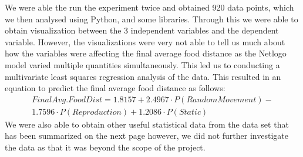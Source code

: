 \documentclass[a4paper, 11pt]{article}
\begin{document}
We were able the run the experiment twice and obtained 920 data points, which we then analysed using Python, and some libraries. Through this we were able to obtain visualization between the 3 independent variables and the dependent variable. However, the visualizations were very not able to tell us much about how the variables were affecting the final average food distance as the Netlogo model varied multiple quantities simultaneously. This led us to conducting a multivariate least squares regression analysis of the data. This resulted in an equation to predict the final average food distance as follows:
\begin{multline*}
        Final Avg. Food Dist = 1.8157 + 2.4967\cdot P(Random Movement) -\\ 1.7596\cdot P(Reproduction) + 1.2086\cdot P(Static)
\end{multline*}
We were also able to obtain other useful statistical data from the data set that has been summarized on the next page however, we did not further investigate the data as that it was beyond the scope of the project. 
\end{document}
